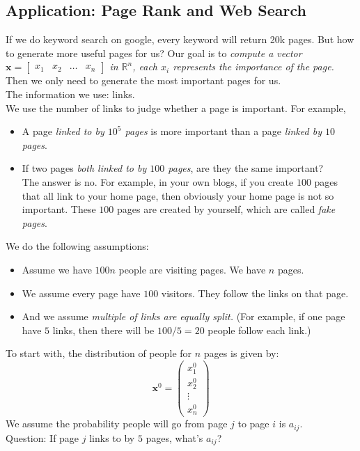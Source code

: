 \subsection{Application: Page Rank and Web Search}
If we do keyword search on google, every keyword will return 20k pages. But how to generate more useful pages for us? Our goal is to \textit{compute a vector $\bm x=\begin{bmatrix}
x_1&x_2&\dots&x_n
\end{bmatrix}$ in $\mathbb{R}^{n}$, each $x_i$ represents the importance of the page.} Then we only need to generate the most important pages for us.\\
\newpage
The information we use: links.\\
We use the number of links to judge whether a page is important. For example,
\begin{itemize}
\item
A page \textit{linked to by $10^5$ pages} is more important than a page \textit{linked by $10$ pages}.
\item
If two pages \textit{both linked to by $100$ pages}, are they the same important?\\
The answer is no. For example, in your own blogs, if you create $100$ pages that all link to your home page, then obviously your home page is not so important. These $100$ pages are created by yourself, which are called \emph{fake pages}.
\end{itemize}
We do the following assumptions:
\begin{itemize}
\item
Assume we have $100n$ people are visiting pages. We have $n$ pages.
\item
We assume every page have $100$ visitors. They follow the links on that page.
\item
And we assume \textit{multiple of links are equally split.} (For example, if one page have $5$ links, then there will be $100/5=20$ people follow each link.)
\end{itemize}
To start with, the distribution of people for $n$ pages is given by:
\[
\bm x^0=\begin{pmatrix}
x_1^0\\x_2^0\\\vdots\\x_n^0
\end{pmatrix}
\]
We assume the probability people will go from page $j$ to page $i$ is $a_{ij}$.\\
Question: If page $j$ links to by $5$ pages, what's $a_{ij}$?\\
